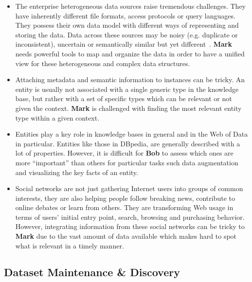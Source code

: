 \begin{itemize}
	\item The enterprise heterogeneous data sources raise tremendous challenges. They have inherently different file formats, access protocols or query languages. They possess their own data model with different ways of representing and storing the data. Data across these sources may be noisy (e.g. duplicate or inconsistent), uncertain or semantically similar but yet different~\cite{Avitha:EuroJorunal:11}. \textbf{Mark} needs powerful tools to map and organize the data in order to have a unified view for these heterogeneous and complex data structures.
	\item Attaching metadata and semantic information to instances can be tricky. An entity is usually not associated with a single generic type in the knowledge base, but rather with a set of specific types which can be relevant or not given the context. \textbf{Mark} is challenged with finding the most relevant entity type within a given context.
	\item Entities play a key role in knowledge bases in general and in the Web of Data in particular. Entities like those in DBpedia, are generally described with a lot of properties. However, it is difficult for \textbf{Bob} to assess which ones are more ``important'' than others for particular tasks such data augmentation and visualizing the key facts of an entity.
	\item Social networks are not just gathering Internet users into groups of common interests, they are also helping people follow breaking news, contribute to online debates or learn from others. They are transforming Web usage in terms of users' initial entry point, search, browsing and purchasing behavior. However, integrating information from these social networks can be tricky to \textbf{Mark} due to the vast amount of data available which makes hard to spot what is relevant in a timely manner.
\end{itemize}

\subsection{Dataset Maintenance \& Discovery}

